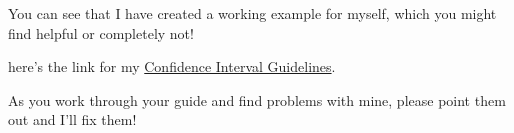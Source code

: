 \documentclass{tufte-handout}\usepackage[]{graphicx}\usepackage[]{color}
\begin{document}
You can see that I have created a working example for myself, which you might find helpful or completely not!

here's the link for my \href{https://github.com/marclos/beginnersluck/raw/master/Confidence_Intervals/Confidence_Intervals.pdf}{Confidence Interval Guidelines}. 

As you work through your guide and find problems with mine, please point them out and I'll fix them!

\FloatBarrier 
\begin{fullwidth}
%
%
\end{fullwidth}
\end{document}
